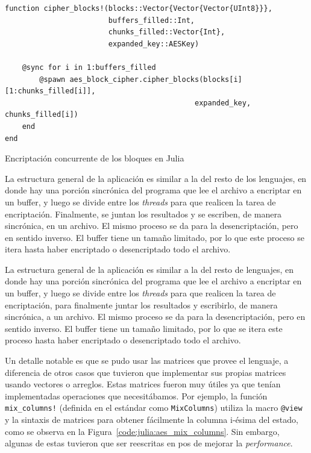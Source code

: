 \documentclass[11pt]{article}
\newcommand{\english}[1]{\textit{#1}}
\begin{document}
\begin{listing}[h]
\begin{verbatim}
function cipher_blocks!(blocks::Vector{Vector{Vector{UInt8}}},
                        buffers_filled::Int,
                        chunks_filled::Vector{Int},
                        expanded_key::AESKey)

    @sync for i in 1:buffers_filled
        @spawn aes_block_cipher.cipher_blocks(blocks[i][1:chunks_filled[i]],
                                            expanded_key, chunks_filled[i])
    end
end
\end{verbatim}
\caption{Encriptación concurrente de los bloques en Julia}
\label{code:julia:aes_concurrent}
\end{listing}

La estructura general de la aplicación es similar a la del resto de los lenguajes, en donde hay una porción sincrónica del programa que lee el archivo a encriptar en un buffer, y luego se divide entre los \textit{threads} para que realicen la tarea de encriptación. Finalmente, se juntan los resultados y se escriben, de manera sincrónica, en un archivo. El mismo proceso se da para la desencriptación, pero en sentido inverso. El buffer tiene un tamaño limitado, por lo que este proceso se itera hasta haber encriptado o desencriptado todo el archivo.

La estructura general de la aplicación es similar a la del resto de lenguajes, en donde hay una porción sincrónica del programa que lee el archivo a encriptar en un buffer, y luego se divide entre los \english{threads} para que realicen la tarea de encriptación, para finalmente juntar los resultados y escribirlo, de manera sincrónica, a un archivo. El mismo proceso se da para la desencriptación, pero en sentido inverso. El buffer tiene un tamaño limitado, por lo que se itera este proceso hasta haber encriptado o desencriptado todo el archivo.

Un detalle notable es que se pudo usar las matrices que provee el lenguaje, a diferencia de otros casos que tuvieron que implementar sus propias matrices usando vectores o arreglos. Estas matrices fueron muy útiles ya que tenían implementadas operaciones que necesitábamos. Por ejemplo, la función \lstinline{mix_columns!} (definida en el estándar como \lstinline{MixColumns}) utiliza la macro \lstinline{@view} y la sintaxis de matrices para obtener fácilmente la columna i-ésima del estado, como se observa en la Figura~\ref{code:julia:aes_mix_columns}. Sin embargo, algunas de estas tuvieron que ser reescritas en pos de mejorar la \english{performance}.
\end{document}
